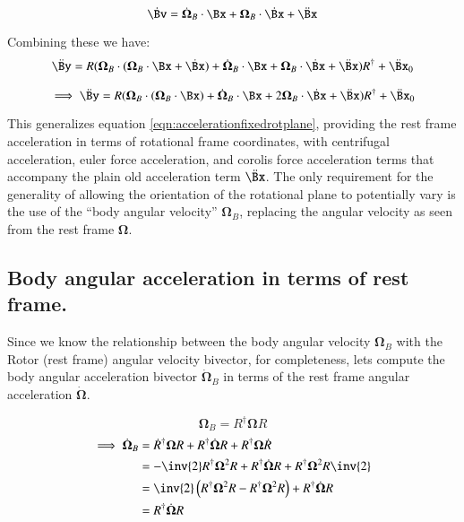 \documentclass{article}      %
\newcommand{\dt}[1]{\dot{#1}}
\newcommand{\ddt}[1]{\ddot{#1}}
\newcommand{\BOmega}[0]{\boldsymbol{\Omega}}
\begin{document}
\[
\dt{\Bv} = 
\dt{\BOmega}_B \cdot \Bx 
+\BOmega_B \cdot \dt{\Bx}
+ \ddt{\Bx}
\]

Combining these we have:
\begin{align*}
\ddt{\By} 
&= {R (\BOmega_B \cdot ( \BOmega_B \cdot \Bx + \dt{\Bx} ) + \dt{\BOmega}_B \cdot \Bx +\BOmega_B \cdot \dt{\Bx} + \ddt{\Bx}) R^\dagger} + \ddt{\Bx}_0 \\
\end{align*}

\begin{equation}
\implies
\ddt{\By} 
= {R (\BOmega_B \cdot ( \BOmega_B \cdot \Bx ) + \dt{\BOmega}_B \cdot \Bx + 2\BOmega_B \cdot \dt{\Bx} + \ddt{\Bx}) R^\dagger} + \ddt{\Bx}_0
\end{equation}

This generalizes equation \ref{eqn:accelerationfixedrotplane}, providing the rest frame acceleration in terms of rotational frame coordinates, with centrifugal acceleration, euler force acceleration, and corolis force acceleration terms that accompany the plain old acceleration term $\ddt{\Bx}$.  The only
requirement for the generality of allowing the orientation of the rotational plane to potentially vary is the use of the ``body angular velocity''
$\BOmega_B$, replacing the angular velocity as seen from the rest frame $\BOmega$.

\subsection{ Body angular acceleration in terms of rest frame. }

Since we know the relationship between the body angular velocity $\BOmega_B$ with the Rotor (rest frame) angular velocity bivector, for
completeness, lets compute the body angular acceleration bivector $\dt{\BOmega}_B$ in terms of the rest frame angular acceleration $\dt{\BOmega}$.

\[
\BOmega_B = R^\dagger \BOmega R
\]
\begin{align*}
\implies
\dt{\BOmega}_B 
&= \dt{R}^\dagger \BOmega R +R^\dagger \dt{\BOmega} R +R^\dagger \BOmega \dt{R} \\
&= -\inv{2}R^\dagger \BOmega^2 R +R^\dagger \dt{\BOmega} R +R^\dagger \BOmega^2 R \inv{2} \\
&= \inv{2} \left(R^\dagger \BOmega^2 R - R^\dagger \BOmega^2 R\right) +R^\dagger \dt{\BOmega} R \\
&= R^\dagger \dt{\BOmega} R \\
\end{align*}
\end{document}
